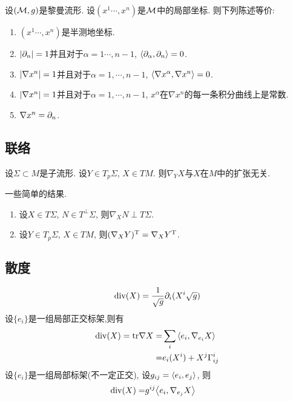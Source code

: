 \begin{lemma}
    设$(\M,g)$是黎曼流形.  设$(x^1\cdots, x^n)$是$\M$中的局部坐标. 则下列陈述等价:
    \begin{enumerate}
        \item $(x^1\cdots, x^n)$是半测地坐标.
        \item $\abs{\P_n}=1$并且对于$\alpha=1\cdots,n-1$, $\inner{\P_\alpha}{\P_n}=0$.
        \item $\abs{\nabla x^n}=1$并且对于$\alpha=1,\cdots,n-1$, $\inner{\nabla x^\alpha}{\nabla x^n}=0$.
        \item $\abs{\nabla x^n}=1$并且对于$\alpha=1,\cdots,n-1$, $x^\alpha$在$\nabla x^n$的每一条积分曲线上是常数.
        \item $\nabla x^n=\P_n$.
    \end{enumerate}
\end{lemma}

\subsection{联络}
\begin{proposition}
    设$\Sigma \subset M$是子流形.  设$Y \in T_p\Sigma$, $X \in TM$. 则$\nabla_YX$与$X$在$M$中的扩张无关.
\end{proposition}
一些简单的结果.
\begin{enumerate}
    \item 设$X\in T\Sigma$, $N \in T^\perp\Sigma$, 则$\nabla_X N \perp T\Sigma$.
    \item 设$Y \in T_p \Sigma$, $X \in TM$, 则$(\nabla_XY)^\tangent=\nabla_X{Y^\tangent}$.
\end{enumerate}
\subsection{散度}
\begin{equation}
    \div(X)=\rec{\sqrt{g}}\P_i(X^i\sqrt{g})
\end{equation}
设$\{e_i\}$是一组局部正交标架,则有
\begin{equation}
    \begin{split}
        \div(X)=\tr\nabla X=&\sum_i \inner{e_i}{\nabla_{e_i}X} \\
        =&e_i(X^i)+X^j\Gamma^i_{ij}
    \end{split}
\end{equation}
设$\{e_i\}$是一组局部标架(不一定正交), 设$g_{ij}=\inner{e_i}{e_j}$, 则
\begin{equation}
    \begin{split}
        \div(X)=&g^{ij}\inner{e_i}{\nabla_{e_j}X}
    \end{split}
\end{equation}

